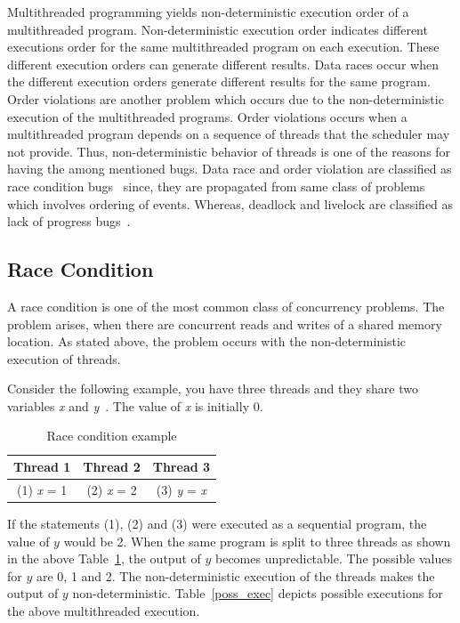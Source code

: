 Multithreaded programming yields non-deterministic execution order of a multithreaded program. 
Non-deterministic execution order indicates different executions order for the same multithreaded program on each execution. 
These different execution orders can generate different results. 
Data races occur when the different execution orders generate different results for the same program. 
Order violations are another problem which occurs due to the non-deterministic execution of the multithreaded programs. 
Order violations occurs when a multithreaded program depends on a sequence of threads that the scheduler may not provide. 
Thus, non-deterministic behavior of threads is one of the reasons for having the among mentioned bugs. 
Data race and order violation are classified as race condition bugs~\citep{lopez2017study} since, they are propagated from same class of problems which involves ordering of events. 
Whereas, deadlock and livelock are classified as lack of progress bugs~\citep{lopez2017study}. 

\subsection{Race Condition}

A race condition is one of the most common class of concurrency problems.  
The problem arises, when there are concurrent reads and writes of a shared memory location. 
As stated above, the problem occurs with the non-deterministic execution of threads. 

Consider the following example, you have three threads and they share two variables \emph{x} and \emph{y}~\citep{carver2005modern}. 
The value of \emph{x} is initially 0. 

\begin{table}[h]
\centering
\begin{tabular}{*{3}{c}}
Thread 1 & Thread 2 & Thread 3 \\
\hline
 (1) \emph{x} = 1 & (2) \emph{x} = 2 & (3) \emph{y} = \emph{x}\\
\end{tabular}
\caption{Race condition example}
\label{race_cond}
\end{table}

If the statements (1), (2) and (3) were executed as a sequential program,  
the value of $y$ would be 2. 
When the same program is split to three threads as shown in the above Table~\ref{race_cond}, the output of $y$ becomes unpredictable. 
The possible values for $y$ are 0, 1 and 2. 
The non-deterministic execution of the threads makes the output of $y$ non-deterministic. 
Table~\ref{poss_exec} depicts possible executions for the above multithreaded execution. 

